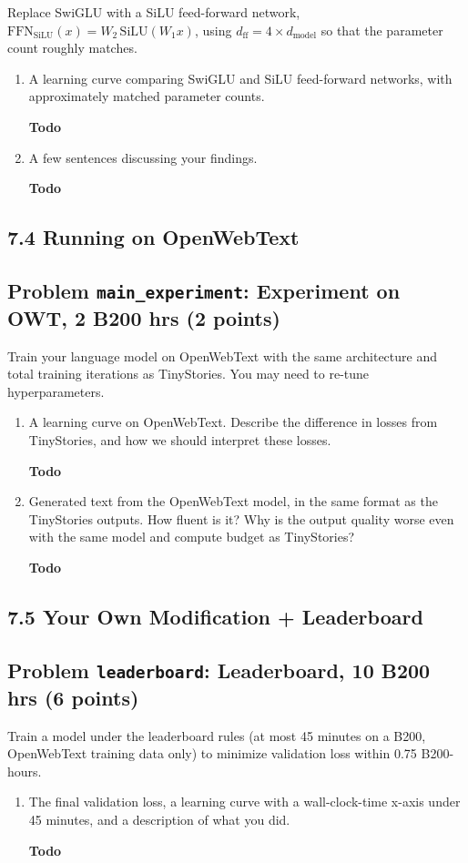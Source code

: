 \documentclass[11pt]{article}
\newcommand{\Todo}{\par\textbf{Todo}\par}
\newcommand{\problem}[2]{%
  \subsection*{Problem \texttt{#1}: #2}%
}
\begin{document}
Replace SwiGLU with a SiLU feed-forward network, $\text{FFN}_{\text{SiLU}}(x) = W_2\,\text{SiLU}(W_1 x)$, using $d_{\text{ff}} = 4 \times d_{\text{model}}$ so that the parameter count roughly matches.

\begin{enumerate}[label=(\alph*)]
  \item A learning curve comparing SwiGLU and SiLU feed-forward networks, with approximately matched parameter counts.
  \Todo
  \item A few sentences discussing your findings.
  \Todo
\end{enumerate}

\subsection*{7.4 Running on OpenWebText}

\problem{main\_experiment}{Experiment on OWT, 2 B200 hrs (2 points)}

Train your language model on OpenWebText with the same architecture and total training iterations as TinyStories. You may need to re-tune hyperparameters.

\begin{enumerate}[label=(\alph*)]
  \item A learning curve on OpenWebText. Describe the difference in losses from TinyStories, and how we should interpret these losses.
  \Todo
  \item Generated text from the OpenWebText model, in the same format as the TinyStories outputs. How fluent is it? Why is the output quality worse even with the same model and compute budget as TinyStories?
  \Todo
\end{enumerate}

\subsection*{7.5 Your Own Modification + Leaderboard}

\problem{leaderboard}{Leaderboard, 10 B200 hrs (6 points)}

Train a model under the leaderboard rules (at most 45 minutes on a B200, OpenWebText training data only) to minimize validation loss within 0.75 B200-hours.

\begin{enumerate}[label=(\alph*)]
  \item The final validation loss, a learning curve with a wall-clock-time x-axis under 45 minutes, and a description of what you did.
  \Todo
\end{enumerate}
\end{document}
